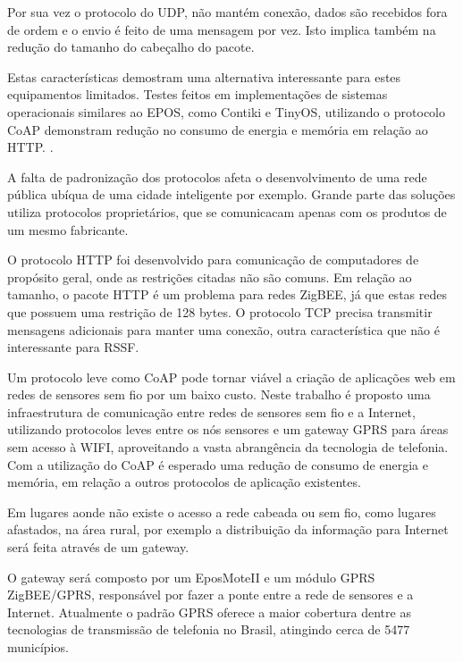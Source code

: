 Por sua vez o protocolo do UDP, n\~ao mant\'em conex\~ao, dados s\~ao recebidos fora de ordem e o envio \'e feito de uma mensagem por vez.  Isto implica tamb\'em na redu\c{c}\~ao do tamanho do cabe\c{c}alho do pacote.

Estas caracter\'isticas demostram uma alternativa interessante para estes equipamentos limitados. Testes feitos em implementa\c{c}\~oes de sistemas operacionais similares ao EPOS, como Contiki e TinyOS, utilizando o protocolo CoAP demonstram redu\c{c}\~ao no consumo de energia e mem\'oria em rela\c{c}\~ao ao HTTP.\cite{} .

A falta de padroniza\c{c}\~ao dos protocolos afeta o desenvolvimento de uma rede p\'ublica ub\'iqua de uma cidade inteligente por exemplo. Grande parte das solu\c{c}\~oes utiliza protocolos propriet\'arios, que se comunicacam apenas com os produtos de um mesmo fabricante.

O protocolo HTTP foi desenvolvido para comunica\c{c}\~ao de computadores de prop\'osito geral, onde as restri\c{c}\~oes citadas n\~ao s\~ao comuns. Em rela\c{c}\~ao ao tamanho, o pacote HTTP \'e um problema para redes ZigBEE, j\'a que estas redes que possuem uma restri\c{c}\~ao de 128 bytes. O protocolo TCP precisa transmitir mensagens adicionais para manter uma conex\~ao, outra caracter\'istica que n\~ao \'e interessante para RSSF.

Um protocolo leve como CoAP pode tornar vi\'avel a cria\c{c}\~ao de aplica\-\c{c}\~oes web em redes de sensores sem fio por um baixo custo. Neste trabalho \'e proposto uma infraestrutura de comunica\c{c}\~ao entre redes de sensores sem fio e a Internet, utilizando protocolos leves entre os n\'os sensores e um gateway GPRS para \'areas sem acesso \`a WIFI, aproveitando a vasta abrang\^encia da tecnologia de telefonia. Com a utiliza\c{c}\~ao do CoAP \'e esperado uma redu\c{c}\~ao de consumo de energia e mem\'oria, em rela\c{c}\~ao a outros protocolos de aplica\c{c}\~ao existentes.

Em lugares aonde n\~ao existe o acesso a rede cabeada ou sem fio, como lugares afastados, na \'area rural, por exemplo a distribui\c{c}\~ao da informa\c{c}\~ao para Internet ser\'a feita atrav\'es de um gateway.

O gateway ser\'a composto por um EposMoteII e um m\'odulo GPRS ZigBEE/GPRS, respons\'avel por fazer a ponte entre a rede de sensores e a Internet. Atualmente o padr\~ao GPRS oferece a maior cobertura dentre as tecnologias de transmiss\~ao de telefonia no Brasil, atingindo cerca de 5477 munic\'ipios.\cite{CoberturaGPRS}



